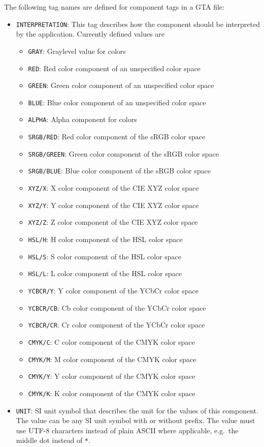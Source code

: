 \documentclass[a4paper,11pt]{article}
\newcommand{\code}[1]{\texttt{#1}}
\begin{document}
The following tag names are defined for component tags in a GTA file:
\begin{itemize}
\item \code{INTERPRETATION}: This tag describes how the component should be
interpreted by the application. Currently defined values are
	\begin{itemize}
	\item \code{GRAY}: Graylevel value for colors
	\item \code{RED}: Red color component of an unspecified color space
	\item \code{GREEN}: Green color component of an unspecified color space
	\item \code{BLUE}: Blue color component of an unspecified color space
	\item \code{ALPHA}: Alpha component for colors
	\item \code{SRGB/RED}: Red color component of the sRGB color space
	\item \code{SRGB/GREEN}: Green color component of the sRGB color space
	\item \code{SRGB/BLUE}: Blue color component of the sRGB color space
	\item \code{XYZ/X}: X color component of the CIE XYZ color space
	\item \code{XYZ/Y}: Y color component of the CIE XYZ color space
	\item \code{XYZ/Z}: Z color component of the CIE XYZ color space
	\item \code{HSL/H}: H color component of the HSL color space
	\item \code{HSL/S}: S color component of the HSL color space
	\item \code{HSL/L}: L color component of the HSL color space
	\item \code{YCBCR/Y}: Y color component of the YCbCr color space
	\item \code{YCBCR/CB}: Cb color component of the YCbCr color space
	\item \code{YCBCR/CR}: Cr color component of the YCbCr color space
	\item \code{CMYK/C}: C color component of the CMYK color space
	\item \code{CMYK/M}: M color component of the CMYK color space
	\item \code{CMYK/Y}: Y color component of the CMYK color space
	\item \code{CMYK/K}: K color component of the CMYK color space
	\end{itemize}
\item \code{UNIT}: SI unit symbol that describes the unit for the values of
this component. The value can be any SI unit symbol with or without prefix.
The value must use \mbox{UTF-8} characters instead of plain ASCII where applicable,
e.g.~the middle dot instead of \code{*}.
\end{itemize}
\end{document}
